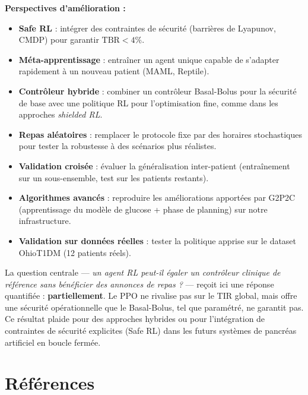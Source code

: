 \documentclass[a4paper,12pt]{report}
\begin{document}
\textbf{Perspectives d'amélioration :}

\begin{itemize}
  \item \textbf{Safe RL} : intégrer des contraintes de sécurité (barrières de Lyapunov, CMDP) pour garantir $\text{TBR} < 4\%$.
  \item \textbf{Méta-apprentissage} : entraîner un agent unique capable de s'adapter rapidement à un nouveau patient (MAML, Reptile).
  \item \textbf{Contrôleur hybride} : combiner un contrôleur Basal-Bolus pour la sécurité de base avec une politique RL pour l'optimisation fine, comme dans les approches \textit{shielded RL}.
  \item \textbf{Repas aléatoires} : remplacer le protocole fixe par des horaires stochastiques pour tester la robustesse à des scénarios plus réalistes.
  \item \textbf{Validation croisée} : évaluer la généralisation inter-patient (entraînement sur un sous-ensemble, test sur les patients restants).
  \item \textbf{Algorithmes avancés} : reproduire les améliorations apportées par G2P2C (apprentissage du modèle de glucose + phase de planning) sur notre infrastructure.
  \item \textbf{Validation sur données réelles} : tester la politique apprise sur le dataset OhioT1DM (12 patients réels).
\end{itemize}

\vspace{1cm}

\begin{tcolorbox}[colback=primary!5, colframe=primary, title={\color{white}\textbf{Conclusion générale}}]
La question centrale --- \emph{un agent RL peut-il égaler un contrôleur clinique de référence sans bénéficier des annonces de repas ?} --- reçoit ici une réponse quantifiée : \textbf{partiellement}. Le PPO ne rivalise pas sur le TIR global, mais offre une sécurité opérationnelle que le Basal-Bolus, tel que paramétré, ne garantit pas. Ce résultat plaide pour des approches hybrides ou pour l'intégration de contraintes de sécurité explicites (Safe RL) dans les futurs systèmes de pancréas artificiel en boucle fermée.
\end{tcolorbox}

\newpage

\chapter*{Références}
\end{document}

